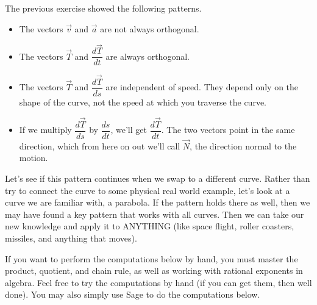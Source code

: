 \begin{observation}\label{curvature observations}
 The previous exercise showed the following patterns.
\begin{itemize}
 \item The vectors $\vec v$ and $\vec a$ are not always orthogonal.
 \item The vectors $\vec T$ and $\dfrac{d\vec T}{dt}$ are always orthogonal.
 \item The vectors $\vec T$ and $\dfrac{d\vec T}{ds}$ are independent of speed. They depend only on the shape of the curve, not the speed at which you traverse the curve.
 \item If we multiply $\dfrac{d\vec T}{ds}$ by $\dfrac{ds}{dt}$, we'll get $\dfrac{d\vec T}{dt}$. The two vectors point in the same direction, which from here on out we'll call $\vec N$, the direction normal to the motion.
\end{itemize}
\end{observation}

Let's see if this pattern continues when we swap to a different curve. 
Rather than try to connect the curve to some physical real world example, let's look at a curve we are familiar with, a parabola. If the pattern holds there as well, then we may have found a key pattern that works with all curves.  Then we can take our new knowledge and apply it to ANYTHING (like space flight, roller coasters, missiles, and anything that moves).

If you want to perform the computations below by hand, you must master the product, quotient, and chain rule, as well as working with rational exponents in algebra. Feel free to try the computations by hand (if you can get them, then well done). You may also simply use Sage to do the computations below.



